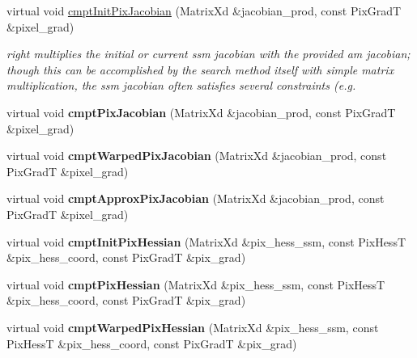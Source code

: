 \begin{DoxyCompactItemize}
\item 
virtual void \hyperlink{classStateSpaceModel_ac956c679581e746891c62755fe715b3b}{cmpt\-Init\-Pix\-Jacobian} (Matrix\-Xd \&jacobian\-\_\-prod, const Pix\-Grad\-T \&pixel\-\_\-grad)
\begin{DoxyCompactList}\small\item\em right multiplies the initial or current ssm jacobian with the provided am jacobian; though this can be accomplished by the search method itself with simple matrix multiplication, the ssm jacobian often satisfies several constraints (e.\-g. \end{DoxyCompactList}\item 
\hypertarget{classStateSpaceModel_a640fd53fcecfed4f91278b7164946384}{virtual void {\bfseries cmpt\-Pix\-Jacobian} (Matrix\-Xd \&jacobian\-\_\-prod, const Pix\-Grad\-T \&pixel\-\_\-grad)}\label{classStateSpaceModel_a640fd53fcecfed4f91278b7164946384}

\item 
\hypertarget{classStateSpaceModel_a1c6b8896c06a492e0cbe923ee8f2aba0}{virtual void {\bfseries cmpt\-Warped\-Pix\-Jacobian} (Matrix\-Xd \&jacobian\-\_\-prod, const Pix\-Grad\-T \&pixel\-\_\-grad)}\label{classStateSpaceModel_a1c6b8896c06a492e0cbe923ee8f2aba0}

\item 
\hypertarget{classStateSpaceModel_a60540eda9d975f5172d2700712ed401d}{virtual void {\bfseries cmpt\-Approx\-Pix\-Jacobian} (Matrix\-Xd \&jacobian\-\_\-prod, const Pix\-Grad\-T \&pixel\-\_\-grad)}\label{classStateSpaceModel_a60540eda9d975f5172d2700712ed401d}

\item 
\hypertarget{classStateSpaceModel_ace3041e8376c3cdb9b639975017840ca}{virtual void {\bfseries cmpt\-Init\-Pix\-Hessian} (Matrix\-Xd \&pix\-\_\-hess\-\_\-ssm, const Pix\-Hess\-T \&pix\-\_\-hess\-\_\-coord, const Pix\-Grad\-T \&pix\-\_\-grad)}\label{classStateSpaceModel_ace3041e8376c3cdb9b639975017840ca}

\item 
\hypertarget{classStateSpaceModel_a25c016504e7aed4e4a089273a0210524}{virtual void {\bfseries cmpt\-Pix\-Hessian} (Matrix\-Xd \&pix\-\_\-hess\-\_\-ssm, const Pix\-Hess\-T \&pix\-\_\-hess\-\_\-coord, const Pix\-Grad\-T \&pix\-\_\-grad)}\label{classStateSpaceModel_a25c016504e7aed4e4a089273a0210524}

\item 
\hypertarget{classStateSpaceModel_a03223676277e6f5a6be4d7c3e24076bf}{virtual void {\bfseries cmpt\-Warped\-Pix\-Hessian} (Matrix\-Xd \&pix\-\_\-hess\-\_\-ssm, const Pix\-Hess\-T \&pix\-\_\-hess\-\_\-coord, const Pix\-Grad\-T \&pix\-\_\-grad)}\label{classStateSpaceModel_a03223676277e6f5a6be4d7c3e24076bf}


\end{DoxyCompactItemize}
